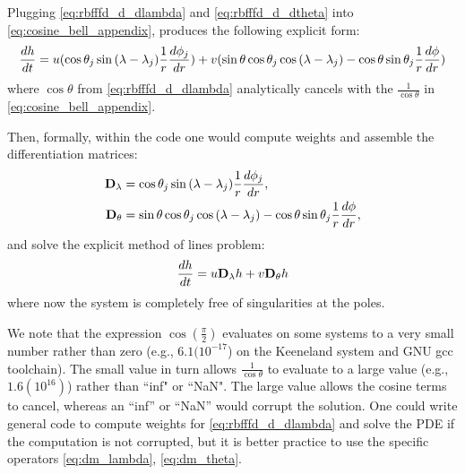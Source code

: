 Plugging \ref{eq:rbfffd_d_dlambda} and \ref{eq:rbfffd_d_dtheta} into \ref{eq:cosine_bell_appendix}, produces the following explicit form: 
\begin{align*}
\frac{d h}{d t} = u(\cos{\theta_j}\sin{(\lambda - \lambda_j)} \frac{1}{r} \frac{d \phi_j}{d r}) + v (\sin{\theta}\cos{\theta_j}\cos{(\lambda-\lambda_j)} - \cos{\theta}\sin{\theta_j} \frac{1}{r} \frac{d \phi}{d r}) 
\end{align*}
where $\cos{\theta}$ from \ref{eq:rbfffd_d_dlambda} analytically cancels with the $\frac{1}{\cos{\theta}}$ in \ref{eq:cosine_bell_appendix}.


Then, formally, within the code one would compute weights and assemble the differentiation matrices: 
\begin{align}
\mathbf{D}_\lambda & = \cos{\theta_j}\sin{(\lambda - \lambda_j)} \frac{1}{r} \frac{d \phi_j}{d r}, \label{eq:dm_lambda} \\
\mathbf{D}_\theta &=  \sin{\theta}\cos{\theta_j}\cos{(\lambda-\lambda_j)} - \cos{\theta}\sin{\theta_j} \frac{1}{r} \frac{d \phi}{d r}, \label{eq:dm_theta}
\end{align} 
and solve the explicit method of lines problem:
$$
\frac{d h}{d t} = u \mathbf{D}_\lambda h + v \mathbf{D}_\theta h
$$
where now the system is completely free of singularities at the poles. 

We note that the expression $\cos{(\frac{\pi}{2})}$ evaluates on some systems to a very small number rather than zero (e.g., $6.1(10^{-17}$) on the Keeneland system and GNU gcc toolchain). The small value in turn allows $\frac{1}{\cos{\theta}}$ to evaluate to a large value (e.g., $1.6(10^{16})$) rather than ``inf" or ``NaN". The large value allows the cosine terms to cancel, whereas an ``inf'' or ``NaN'' would corrupt the solution. One could write general code to compute weights for \ref{eq:rbfffd_d_dlambda} and solve the PDE if the computation is not corrupted, but it is better practice to use the specific operators \ref{eq:dm_lambda}, \ref{eq:dm_theta}.